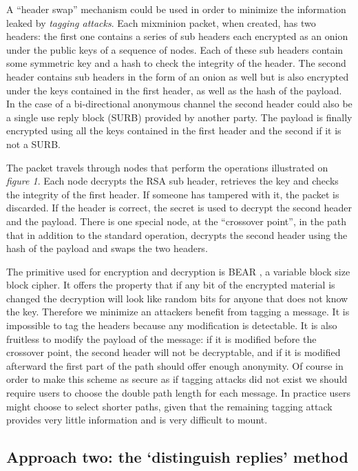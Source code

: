 \documentclass{llncs}
\begin{document}
A ``header swap'' mechanism could be used in order to minimize the
information leaked by \emph{tagging attacks}. Each mixminion packet,
when created, has two headers: the first one contains a series of sub
headers each encrypted as an onion under the public keys of a sequence of
nodes. Each of these sub headers contain some symmetric key and a hash
to check the integrity of the header. The second header contains sub
headers in the form of an onion as well but is also encrypted under
the keys contained in the first header, as well as the hash of the
payload. In the case of a bi-directional anonymous channel the 
second header could also be a single use reply block (SURB)
provided by another party. The payload is finally encrypted using all
the keys contained in the first header and the second if it is not a SURB.

The packet travels through nodes that perform the operations illustrated
on \emph{figure 1}. Each node decrypts the RSA sub header, retrieves
the key and checks the integrity of the first header. If someone has
tampered with it, the packet is discarded. If the header is correct,
the secret is used to decrypt the second header and the payload. There
is one special node, at the ``crossover point'', in the path that in
addition to the standard operation, decrypts the second header using
the hash of the payload and swaps the two headers.

The primitive used for encryption and decryption is BEAR \cite{BEAR},
a variable block size block cipher. It offers the property that if any
bit of the encrypted material is changed the decryption will look like
random bits for anyone that does not know the key. Therefore we minimize
an attackers benefit from tagging a message. It is impossible to tag the
headers because any modification is detectable. It is also fruitless to
modify the payload of the message: if it is modified before the crossover
point, the second header will not be decryptable, and if it is modified
afterward the first part of the path should offer enough anonymity. Of
course in order to make this scheme as secure as if tagging attacks did
not exist we should require users to choose the double path length for
each message. In practice users might choose to select shorter paths,
given that the remaining tagging attack provides very little information 
and is very difficult to mount.

\subsection{Approach two: the `distinguish replies' method}
\label{subsec:distinguish-replies}
\end{document}
